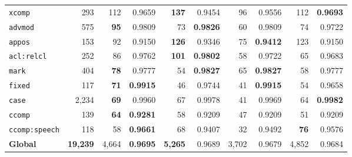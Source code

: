 \begin{table}[p]
\begin{tabular}{l r| r r| r r| r r| r r}
  \texttt{xcomp} & 293 & 112 & 0.9659 & \textbf{137} & 0.9454 & 96 & 0.9556 & 112 & \textbf{0.9693} \\
  \texttt{advmod} & 575 & \textbf{95} & 0.9809 & 73 & \textbf{0.9826} & 60 & 0.9809 & 74 & 0.9722 \\
  \texttt{appos} & 153 & 92 & 0.9150 & \textbf{126} & 0.9346 & 75 & \textbf{0.9412} & 123 & 0.9150 \\
  \texttt{acl\!:\!relcl} & 252 & 86 & 0.9762 & \textbf{101} & \textbf{0.9802} & 58 & 0.9722 & 65 & 0.9683 \\
  \texttt{mark} & 404 & \textbf{78} & 0.9777 & 54 & \textbf{0.9827} & 65 & \textbf{0.9827} & 58 & 0.9777 \\
  \texttt{fixed} & 117 & \textbf{71} & \textbf{0.9915} & 46 & 0.9744 & 41 & \textbf{0.9915} & 54 & 0.9658 \\
  \texttt{case} & 2,234 & \textbf{69} & 0.9960 & 67 & 0.9978 & 41 & 0.9969 & 64 & \textbf{0.9982} \\
  \texttt{ccomp} & 139 & \textbf{64} & \textbf{0.9281} & 58 & 0.9209 & 47 & 0.9209 & 51 & 0.9209 \\
  \texttt{ccomp\!:\!speech} & 118 & 58 & \textbf{0.9661} & 68 & 0.9407 & 32 & 0.9492 & \textbf{76} & 0.9576 \\
\midrule
  \textbf{Global} & \textbf{19,239} & 4,664 & \textbf{0.9695} & \textbf{5,265} & 0.9689 & 3,702 & 0.9679 & 4,852 & 0.9684 \\
\bottomrule
\end{tabular}
\endgroup
\instablegendaFull
\end{table}

